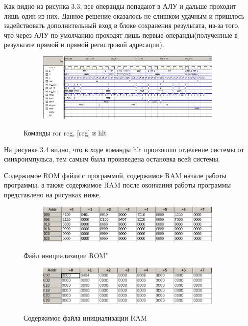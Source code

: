 Как видно из рисунка 3.3, все операнды попадают в АЛУ и дальше проходит лишь один из них. Данное решение оказалось не слишком удачным и пришлось задействовать дополнительный вход в блоке сохранения результата, из-за того, что через АЛУ по умолчанию проходят лишь первые операнды(полученные в результате прямой и прямой регистровой адресации).

\begin{figure}[ht]
\centering
  \begin{subfigure}[b]{\textwidth}
    \centering
    \includegraphics[scale=0.65]{pc_wave2_part4}
    \caption{}
  \end{subfigure}
    \caption{Команды ror reg, [reg] и hlt}
\end{figure}

На рисунке 3.4 видно, что в ходе команды hlt произошло отделение системы от синхроимпульса, тем самым была произведена остановка всей системы.

Содержимое ROM файла с программой, содержимое RAM начале работы программы, а также содержимое RAM после окончания работы программы представлено на рисунках ниже.

\begin{figure}[ht]
\centering
  \begin{subfigure}[b]{\textwidth}
    \centering
    \includegraphics[scale=0.8]{rom2}
    \caption{}
  \end{subfigure}
    \caption{Файл инициализации ROM"}
\end{figure}

\begin{figure}[ht]
\centering
  \begin{subfigure}[b]{\textwidth}
    \centering
    \includegraphics[scale=0.8]{ram21}
    \caption{}
  \end{subfigure}
    \caption{Содержимое файла инициализации RAM}
\end{figure}

